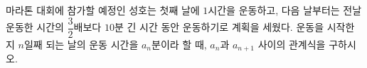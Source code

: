 마라톤 대회에 참가할 예정인 성호는 첫째 날에 $1$시간을 운동하고, 다음 날부터는 전날 운동한 시간의 $\dfrac{3}{2}$배보다 $10$분 긴 시간 동안 운동하기로 계획을 세웠다. 운동을 시작한 지 $n$일째 되는 날의 운동 시간을 $a_n$분이라 할 때, $a_n$과 $a_{n+1}$ 사이의 관계식을 구하시오.
